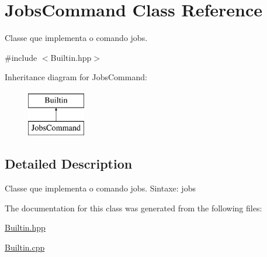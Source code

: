 \hypertarget{classJobsCommand}{
\section{JobsCommand Class Reference}
\label{classJobsCommand}
}


Classe que implementa o comando jobs.  




{\ttfamily \#include $<$Builtin.hpp$>$}

Inheritance diagram for JobsCommand:\begin{figure}[H]
\begin{center}
\leavevmode
\includegraphics[height=2.000000cm]{classJobsCommand}
\end{center}
\end{figure}


\subsection{Detailed Description}
Classe que implementa o comando jobs. Sintaxe: jobs 

The documentation for this class was generated from the following files:\begin{DoxyCompactItemize}
\item 
\hyperlink{Builtin_8hpp}{Builtin.hpp}\item 
\hyperlink{Builtin_8cpp}{Builtin.cpp}\end{DoxyCompactItemize}
